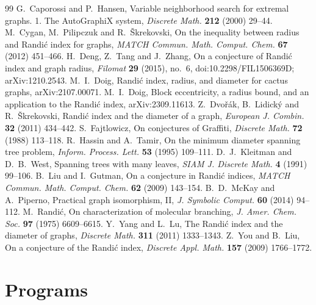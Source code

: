 \documentclass[11pt]{amsart}
\theoremstyle{definition}
\begin{document}
\begin{thebibliography}{99}
 G.~Caporossi and P.~Hansen, Variable neighborhood search for extremal graphs. 1. The AutoGraphiX system,
  \emph{Discrete Math.} \textbf{212} (2000) 29--44.
 M.~Cygan, M.~Pilipczuk and R.~\v{S}krekovski, On the inequality between radius and Randi\'c index for graphs,
  \emph{MATCH Commun. Math. Comput. Chem.} \textbf{67} (2012) 451--466.
 H.~Deng, Z.~Tang and J.~Zhang, On a conjecture of Randi\'c index and graph radius,
  \emph{Filomat} \textbf{29} (2015), no.~6, doi:10.2298/FIL1506369D; arXiv:1210.2543.
 M.~I.~Doig, Randi\'c index, radius, and diameter for cactus graphs, arXiv:2107.00071.
 M.~I.~Doig, Block eccentricity, a radius bound, and an application to the Randi\'c index, arXiv:2309.11613.
 Z.~Dvo\v{r}\'ak, B.~Lidick\'y and R.~\v{S}krekovski, Randi\'c index and the diameter of a graph,
  \emph{European J. Combin.} \textbf{32} (2011) 434--442.
 S.~Fajtlowicz, On conjectures of Graffiti, \emph{Discrete Math.} \textbf{72} (1988) 113--118.
 R.~Hassin and A.~Tamir, On the minimum diameter spanning tree problem,
  \emph{Inform. Process. Lett.} \textbf{53} (1995) 109--111.
 D.~J.~Kleitman and D.~B.~West, Spanning trees with many leaves,
  \emph{SIAM J. Discrete Math.} \textbf{4} (1991) 99--106.
 B.~Liu and I.~Gutman, On a conjecture in Randi\'c indices,
  \emph{MATCH Commun. Math. Comput. Chem.} \textbf{62} (2009) 143--154.
 B.~D.~McKay and A.~Piperno, Practical graph isomorphism, II, \emph{J. Symbolic Comput.} \textbf{60} (2014) 94--112.
 M.~Randi\'c, On characterization of molecular branching, \emph{J. Amer. Chem. Soc.} \textbf{97} (1975) 6609--6615.
 Y.~Yang and L.~Lu, The Randi\'c index and the diameter of graphs, \emph{Discrete Math.} \textbf{311} (2011) 1333--1343.
 Z.~You and B.~Liu, On a conjecture of the Randi\'c index, \emph{Discrete Appl. Math.} \textbf{157} (2009) 1766--1772.
\end{thebibliography}

\appendix
\section{Programs}\label{app:code}
\end{document}
